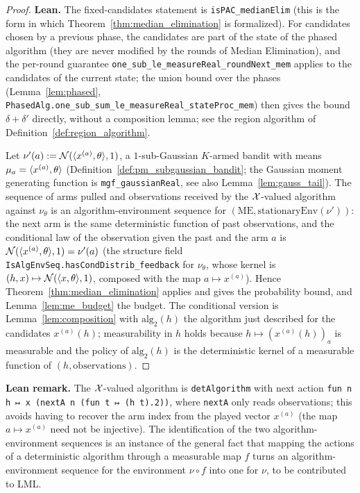 \begin{proof}
\leanok
{}
\textbf{Lean.} The fixed-candidates statement is \texttt{isPAC\_medianElim} (this is the form in
which Theorem~\ref{thm:median_elimination} is formalized). For candidates chosen by a previous
phase, the candidates are part of the state of the phased algorithm (they are never modified
by the rounds of Median Elimination), and the per-round guarantee
\texttt{one\_sub\_le\_measureReal\_roundNext\_mem} applies to the candidates of the current
state; the union bound over the phases (Lemma~\ref{lem:phased},
\texttt{PhasedAlg.one\_sub\_sum\_le\_measureReal\_stateProc\_mem}) then gives the bound
$\delta + \delta'$ directly, without a composition lemma; see the region algorithm of
Definition~\ref{def:region_algorithm}.

Let $\nu'(a) := \mathcal{N}(\langle x^{(a)}, \theta \rangle,1)$, a $1$-sub-Gaussian $K$-armed bandit with means
$\mu_a = \langle x^{(a)}, \theta \rangle$ (Definition~\ref{def:pm_subgaussian_bandit}; the Gaussian moment
generating function is \texttt{mgf\_gaussianReal}, see also Lemma~\ref{lem:gauss_tail}). The
sequence of arms pulled and observations received by the $\mathcal{X}$-valued algorithm against
$\nu_\theta$ is an algorithm-environment sequence for $(\mathrm{ME},\mathrm{stationaryEnv}(\nu'))$:
the next arm is the same deterministic function of past observations, and the conditional law
of the observation given the past and the arm $a$ is $\mathcal{N}(\langle x^{(a)}, \theta \rangle,1) = \nu'(a)$
(the structure field \texttt{IsAlgEnvSeq.hasCondDistrib\_feedback} for $\nu_\theta$, whose
kernel is $(h,x)\mapsto\mathcal{N}(\langle x, \theta \rangle,1)$, composed with the map $a\mapsto x^{(a)}$). Hence Theorem~\ref{thm:median_elimination} applies and gives the
probability bound, and Lemma~\ref{lem:me_budget} the budget. The conditional version is
Lemma~\ref{lem:composition} with $\mathrm{alg}_2(h)$ the algorithm just described for the
candidates $x^{(a)}(h)$; measurability in $h$ holds because $h\mapsto(x^{(a)}(h))_a$ is
measurable and the policy of $\mathrm{alg}_2(h)$ is the deterministic kernel of a measurable
function of $(h,\text{observations})$.
\end{proof}

\textbf{Lean remark.} The $\mathcal{X}$-valued algorithm is \texttt{detAlgorithm} with next action
\texttt{fun n h ↦ x (nextA n (fun t ↦ (h t).2))}, where \texttt{nextA} only reads observations;
this avoids having to recover the arm index from the played vector $x^{(a)}$ (the map
$a\mapsto x^{(a)}$ need not be injective). The identification of the two
algorithm-environment sequences is an instance of the general fact that mapping the actions of
a deterministic algorithm through a measurable map $f$ turns an algorithm-environment sequence
for the environment $\nu\circ f$ into one for $\nu$, to be contributed to LML.
